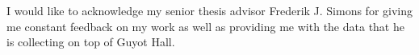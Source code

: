 

I would like to acknowledge my senior thesis advisor Frederik J. Simons for giving me constant feedback on my work as well as providing me with the data that he is collecting on top of Guyot Hall. 